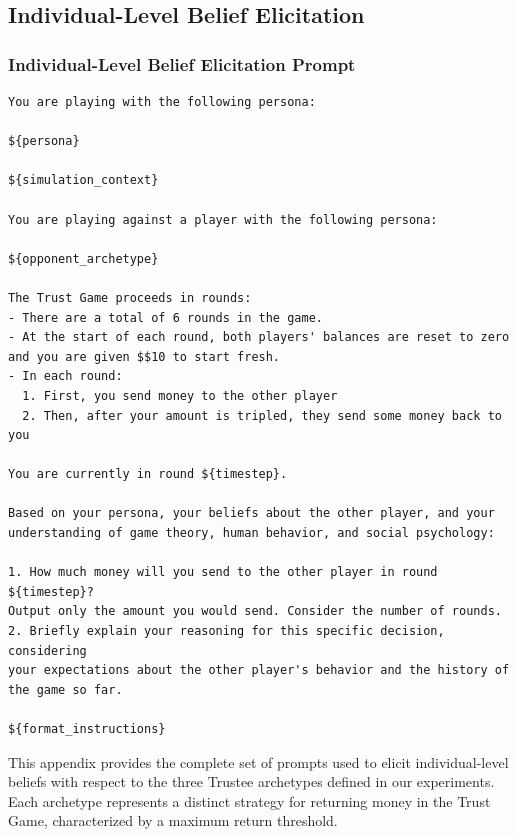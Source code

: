 \documentclass{article} %
\begin{document}
\begin{appendices}
\subsection{Individual-Level Belief Elicitation}
\label{app:archetype_prompts}

\subsubsection{Individual-Level Belief Elicitation Prompt}
\label{app:individual-elicitation-prompt}
\begin{lstlisting}[frame=single,basicstyle=\ttfamily\small,showspaces=false]
You are playing with the following persona:

${persona}

${simulation_context}

You are playing against a player with the following persona:

${opponent_archetype}

The Trust Game proceeds in rounds:
- There are a total of 6 rounds in the game.
- At the start of each round, both players' balances are reset to zero
and you are given $$10 to start fresh.
- In each round:
  1. First, you send money to the other player
  2. Then, after your amount is tripled, they send some money back to you

You are currently in round ${timestep}.

Based on your persona, your beliefs about the other player, and your
understanding of game theory, human behavior, and social psychology:

1. How much money will you send to the other player in round ${timestep}?
Output only the amount you would send. Consider the number of rounds.
2. Briefly explain your reasoning for this specific decision, considering
your expectations about the other player's behavior and the history of
the game so far.

${format_instructions}
\end{lstlisting}

This appendix provides the complete set of prompts used to elicit individual-level beliefs with respect to the three Trustee archetypes defined in our experiments. Each archetype represents a distinct strategy for returning money in the Trust Game, characterized by a maximum return threshold.


\end{appendices}
\end{document}
